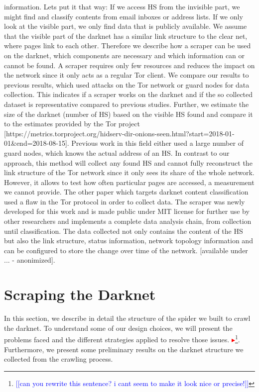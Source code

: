 \documentclass[USenglish,oneside,twocolumn]{article}
\newcommand{\nb}[1]{\textcolor{red}{$\blacktriangleright$}\footnote{\textcolor{blue}{[[#1]]}}}
\begin{document}
information. Lets put it that way: If we access HS from the invisible part, we might find and classify contents from email inboxes or address lists. If we only look at the visible part, we only find data that is publicly available. We assume that the visible part of the darknet has a similar link structure to the clear net, where pages link to each other. Therefore we describe how a scraper can be used on the darknet, which components are necessary and which information can or cannot be found. A scraper requires only few resources and reduces the impact on the network since it only acts as a regular Tor client. We compare our results to previous results, which used attacks on the Tor network or guard nodes for data collection. This indicates if a scraper works on the darknet and if the so collected dataset is representative compared to previous studies. Further, we estimate the size of the darknet (number of HS) based on the visible HS found and compare it to the estimates provided by the Tor project [https://metrics.torproject.org/hidserv-dir-onions-seen.html?start=2018-01-01&end=2018-08-15]. 
Previous work in this field either used a large number of guard nodes, which knows the actual address of an HS. In contrast to our approach, this method will collect any found HS and cannot fully reconstruct the link structure of the Tor network since it only sees its share of the whole network. However, it allows to test how often particular pages are accessed, a measurement we cannot provide. The other paper which targets darknet content classification used a flaw in the Tor protocol in order to collect data.
The scraper was newly developed for this work and is made public under MIT license for further use by other researchers and implements a complete data analysis chain, from collection until classification. The data collected not only contains the content of the HS but also the link structure, status information, network topology information and can be configured to store the change over time of the network. [available under ... - anonimized]. 

\section{Scraping the Darknet}

In this section, we describe in detail the structure of the spider we built to crawl the darknet. To understand some of our design choices, we will present the problems faced and the different strategies applied to resolve those issues. \nb{can you rewrite this sentence? i cant seem to make it look nice or precise!}. Furthermore, we present some preliminary results on the darknet structure we collected from the crawling process.
\end{document}
